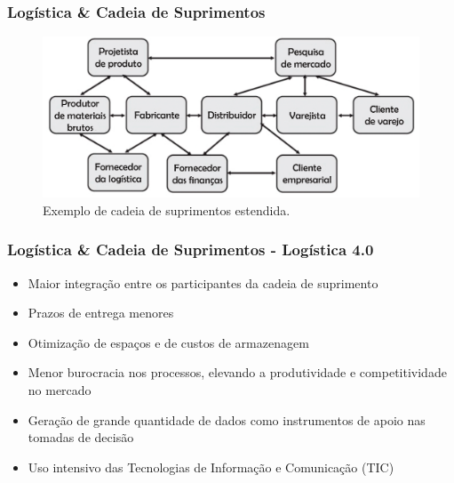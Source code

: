\documentclass[10pt]{beamer}
\begin{document}
\begin{frame}
	
	\frametitle{Logística \& Cadeia de Suprimentos} 
	
	\begin{figure}[htb]
		\centering
		\caption{Exemplo de cadeia de suprimentos estendida.}
		\label{fig:cadeia-de-suprimentos}
		\includegraphics[width=1\textwidth]{cadeia-de-suprimentos.png}
	\end{figure}
	
\end{frame}
\begin{frame}
	
	\frametitle{Logística \& Cadeia de Suprimentos - Logística 4.0}
	
	\begin{itemize}
		\item Maior integração entre os participantes da cadeia de suprimento
		\item Prazos de entrega menores
		\item Otimização de espaços e de custos de armazenagem
		\item Menor burocracia nos processos, elevando a produtividade e competitividade no mercado
		\item Geração de grande quantidade de dados como instrumentos de apoio nas tomadas de decisão
		\item Uso intensivo das Tecnologias de Informação e Comunicação (TIC)
	\end{itemize}
	
\end{frame}
\end{document}
